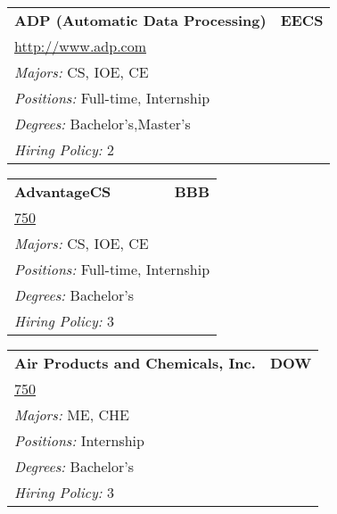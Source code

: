 \documentclass[twoside]{article}
\begin{document}
\begin{center}
\begin{multicols}{3}
\begin{FlushLeft}
\begin{minipage}{.9\columnwidth}\begin{tabularx}{.95\columnwidth}{Xr}
                 {\Large\bf ADP (Automatic Data Processing)} & {\Large\bf EECS}\\
    \multicolumn{2}{p{.95\columnwidth}}{\url{http://www.adp.com}}\\
    \multicolumn{2}{p{.95\columnwidth}}{\emph{Majors:} CS, IOE, CE}\\
    \multicolumn{2}{p{.95\columnwidth}}{\emph{Positions:} Full-time, Internship}\\
    \multicolumn{2}{p{.95\columnwidth}}{\emph{Degrees:} Bachelor's,Master's}\\
    \multicolumn{2}{p{.95\columnwidth}}{\emph{Hiring Policy:} 2}\\
    \end{tabularx}
    
\end{minipage}
 
\begin{minipage}{.9\columnwidth}\begin{tabularx}{.95\columnwidth}{Xr}
                 {\Large\bf AdvantageCS} & {\Large\bf BBB}\\
    \multicolumn{2}{p{.95\columnwidth}}{\url{750}}\\
    \multicolumn{2}{p{.95\columnwidth}}{\emph{Majors:} CS, IOE, CE}\\
    \multicolumn{2}{p{.95\columnwidth}}{\emph{Positions:} Full-time, Internship}\\
    \multicolumn{2}{p{.95\columnwidth}}{\emph{Degrees:} Bachelor's}\\
    \multicolumn{2}{p{.95\columnwidth}}{\emph{Hiring Policy:} 3}\\
    \end{tabularx}
    
\end{minipage}
 
\begin{minipage}{.9\columnwidth}\begin{tabularx}{.95\columnwidth}{Xr}
                 {\Large\bf Air Products and Chemicals, Inc.} & {\Large\bf DOW}\\
    \multicolumn{2}{p{.95\columnwidth}}{\url{750}}\\
    \multicolumn{2}{p{.95\columnwidth}}{\emph{Majors:} ME, CHE}\\
    \multicolumn{2}{p{.95\columnwidth}}{\emph{Positions:} Internship}\\
    \multicolumn{2}{p{.95\columnwidth}}{\emph{Degrees:} Bachelor's}\\
    \multicolumn{2}{p{.95\columnwidth}}{\emph{Hiring Policy:} 3}\\
    \end{tabularx}
    

\end{minipage}
\end{FlushLeft}
\end{multicols}
\end{center}
\end{document}
